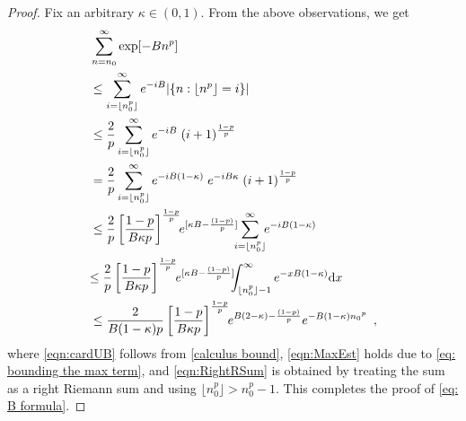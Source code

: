 \documentclass[usenames,dvipsnames,final,12pt]{colt2018} %
\newcommand{\gugan}[1]{#1}
\begin{document}
\begin{proof}
	\gugan{
		Fix an arbitrary $\kappa \in (0, 1).$ From the above observations, we get}
	\begin{align}
	& \sum_{n = n_0}^{\infty} \exp[- B n^{p}] \notag\\
	& \leq  \sum_{i = \lfloor n_0^{p}\rfloor }^{\infty} e^{-i B} |\{n :  \lfloor n^{{p}}\rfloor = i\} | \notag\\
	& \leq  \frac{2}{p}  \sum_{i = \lfloor n_0 ^{p}\rfloor }^{\infty} e^{-i B} \; (i + 1)^{\frac{1- {p}}{{p}}} \label{eqn:cardUB} \\
	& = \frac{2}{{p}}  \sum_{i = \lfloor n_0^{p}\rfloor }^{\infty} e^{-i B(1-\kappa)}\; e^{-i B\kappa}  \; (i + 1)^{\frac{1- {p}}{{p}}} \notag\\
	& \leq \frac{2}{{p}} \left[\frac{1 - p}{B\kappa p}\right]^{\frac{1 - {p}}{{p}}} \! \! e^{[\kappa B- \frac{(1-p)}{p}]} \hspace{-.5em} \sum_{i = \lfloor n_0^{p}\rfloor }^{\infty} \! \! e^{-i B(1-\kappa)}
	\label{eqn:MaxEst}\\
	& { \leq \frac{2}{{p}} \left[\frac{1 - p}{B\kappa p}\right]^{\frac{1 - {p}}{{p}}} \! \! e^{[\kappa B- \frac{(1-p)}{p}]} \hspace{-.5em} \int_{\lfloor n_0^p \rfloor - 1}^{\infty} e^{-x B (1 - \kappa)} \textnormal{d} x} \label{eqn:RightRSum} \\
	& \leq  \frac{2}{{B (1-\kappa) p}} \left[\frac{1- p}{B\kappa {p}}\right]^{\frac{1 - {p}}{{p}}} \! \! e^{B(2-\kappa)-\frac{(1-p)}{p}} e^{-B(1-\kappa) {n_0}^{p}} \enspace, \notag
	\end{align}
	where \eqref{eqn:cardUB} follows from \eqref{calculus bound},
	\eqref{eqn:MaxEst} holds due to \eqref{eq: bounding the max term},
	and \eqref{eqn:RightRSum} is obtained by treating the sum as a right Riemann sum and using $\lfloor n_0^p \rfloor > n_0^p-1.$
	This completes the proof of \eqref{eq: B formula}.
	

\end{proof}
\end{document}
